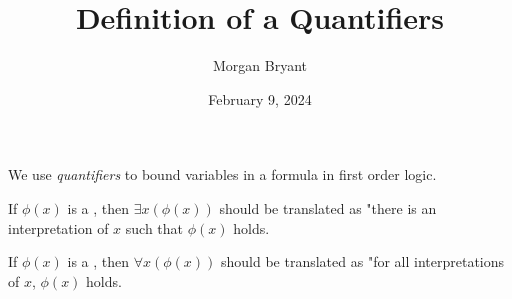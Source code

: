 \documentclass[a4paper]{article}
\title{Definition of a Quantifiers}
\date{February 9, 2024}
\author{Morgan Bryant}
\begin{document}
\maketitle
\par{We use \emph{quantifiers} to bound variables in a formula in first order logic.}\par{If \(\phi (x)\) is a , then \(\exists  x ( \phi (x))\) should be translated as "there is an interpretation of \(x\) such that \(\phi (x)\) holds.}\par{If \(\phi (x)\) is a , then \(\forall  x ( \phi (x))\) should be translated as "for all interpretations of \(x\), \(\phi (x)\) holds.}
\printbibliography
\end{document}
